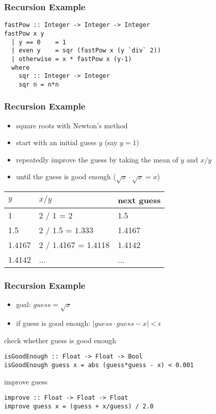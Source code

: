 \documentclass[dvipsnames]{beamer}
\theoremstyle{plain}
\begin{document}
\begin{frame}[fragile]
  \frametitle{Recursion Example}

  \begin{lstlisting}
fastPow :: Integer -> Integer -> Integer
fastPow x y
  | y == 0    = 1
  | even y    = sqr (fastPow x (y `div` 2))
  | otherwise = x * fastPow x (y-1)
  where
    sqr :: Integer -> Integer
    sqr n = n*n
  \end{lstlisting}
\end{frame}

\begin{frame}
  \frametitle{Recursion Example}

  \begin{itemize}
    \item square roots with Newton's method

    \medskip
    \item start with an initial guess $y$ (say $y = 1$)
    \item repeatedly improve the guess by taking the mean of $y$
      and $x / y$
    \item until the guess is good enough ($\sqrt x \cdot \sqrt x = x$)
  \end{itemize}

  \medskip
  \begin{center}
    \begin{tabular}{lll}
    $y$      & $x / y$             & next guess\\\hline
    1        & 2 / 1 = 2           & 1.5\\
    1.5      & 2 / 1.5 = 1.333     & 1.4167\\
    1.4167   & 2 / 1.4167 = 1.4118 & 1.4142\\
    1.4142   & ...                 & ...
    \end{tabular}
  \end{center}
\end{frame}

\begin{frame}[fragile]
  \frametitle{Recursion Example}

  \begin{itemize}
    \item goal: $guess = \sqrt x$
    \item if guess is good enough: $|guess \cdot guess - x| < \epsilon$
  \end{itemize}

  \pause
  \begin{exampleblock}{check whether guess is good enough}
    \begin{lstlisting}
isGoodEnough :: Float -> Float -> Bool
isGoodEnough guess x = abs (guess*guess - x) < 0.001
    \end{lstlisting}
  \end{exampleblock}

  \pause
  \begin{exampleblock}{improve guess}
    \begin{lstlisting}
improve :: Float -> Float -> Float
improve guess x = (guess + x/guess) / 2.0
    \end{lstlisting}
  \end{exampleblock}
\end{frame}
\end{document}
